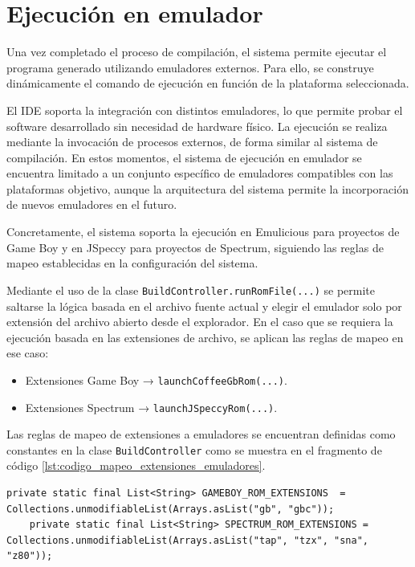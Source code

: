 \documentclass[../../main.tex]{subfiles}
\begin{document}
\section{Ejecución en emulador} 

Una vez completado el proceso de compilación, el sistema permite ejecutar el programa generado utilizando emuladores externos. Para ello, se construye dinámicamente el comando de ejecución en función de la plataforma seleccionada.

El IDE soporta la integración con distintos emuladores, lo que permite probar el software desarrollado sin necesidad de hardware físico. La ejecución se realiza mediante la invocación de procesos externos, de forma similar al sistema de compilación. En estos momentos, el sistema de ejecución en emulador se encuentra limitado a un conjunto específico de emuladores compatibles con las plataformas objetivo, aunque la arquitectura del sistema permite la incorporación de nuevos emuladores en el futuro.

Concretamente, el sistema soporta la ejecución en Emulicious para proyectos de Game Boy y en JSpeccy para proyectos de Spectrum, siguiendo las reglas de mapeo establecidas en la configuración del sistema. 

Mediante el uso de la clase \lstinline|BuildController.runRomFile(...)| se permite saltarse la lógica basada en el archivo fuente actual y elegir el emulador solo por extensión del archivo abierto desde el explorador. En el caso que se requiera la ejecución basada en las extensiones de archivo, se aplican las reglas de mapeo en ese caso:

\begin{itemize}
    \item Extensiones Game Boy → \lstinline|launchCoffeeGbRom(...)|.
    \item Extensiones Spectrum → \lstinline|launchJSpeccyRom(...)|.
\end{itemize}

\clearpage

Las reglas de mapeo de extensiones a emuladores se encuentran definidas como constantes en la clase \lstinline|BuildController| como se muestra en el fragmento de código \ref{lst:codigo_mapeo_extensiones_emuladores}.

\begin{lstlisting}[style=mystyle, caption={Reglas de mapeo de extensiones a emuladores}, label={lst:codigo_mapeo_extensiones_emuladores}]   
    private static final List<String> GAMEBOY_ROM_EXTENSIONS  = Collections.unmodifiableList(Arrays.asList("gb", "gbc"));
    private static final List<String> SPECTRUM_ROM_EXTENSIONS = Collections.unmodifiableList(Arrays.asList("tap", "tzx", "sna", "z80"));
\end{lstlisting}
\end{document}
